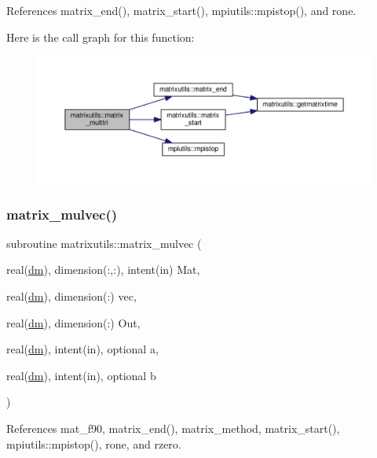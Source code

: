 References matrix\+\_\+end(), matrix\+\_\+start(), mpiutils\+::mpistop(), and rone.

Here is the call graph for this function\+:
\nopagebreak
\begin{figure}[H]
\begin{center}
\leavevmode
\includegraphics[width=350pt]{namespacematrixutils_a5db9de44653dcfa367228c2b5a077b14_cgraph}
\end{center}
\end{figure}
\mbox{\label{namespacematrixutils_a7192e418b9f0d6699a80da809931fed0}} 
\subsubsection{\texorpdfstring{matrix\+\_\+mulvec()}{matrix\_mulvec()}}
{\footnotesize\ttfamily subroutine matrixutils\+::matrix\+\_\+mulvec (\begin{DoxyParamCaption}\item[{real(\mbox{\hyperlink{namespacematrixutils_a7bdc564986ea4d90f51201c75606ef3d}{dm}}), dimension(\+:,\+:), intent(in)}]{Mat,  }\item[{real(\mbox{\hyperlink{namespacematrixutils_a7bdc564986ea4d90f51201c75606ef3d}{dm}}), dimension(\+:)}]{vec,  }\item[{real(\mbox{\hyperlink{namespacematrixutils_a7bdc564986ea4d90f51201c75606ef3d}{dm}}), dimension(\+:)}]{Out,  }\item[{real(\mbox{\hyperlink{namespacematrixutils_a7bdc564986ea4d90f51201c75606ef3d}{dm}}), intent(in), optional}]{a,  }\item[{real(\mbox{\hyperlink{namespacematrixutils_a7bdc564986ea4d90f51201c75606ef3d}{dm}}), intent(in), optional}]{b }\end{DoxyParamCaption})}



References mat\+\_\+f90, matrix\+\_\+end(), matrix\+\_\+method, matrix\+\_\+start(), mpiutils\+::mpistop(), rone, and rzero.

